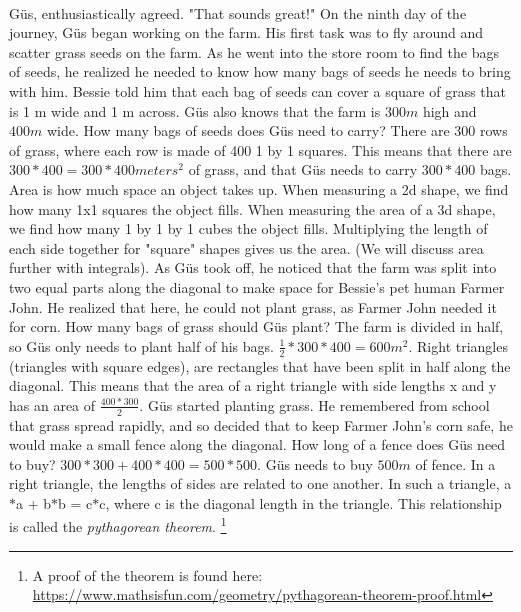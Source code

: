  \paragraph{} Güs, enthusiastically agreed. "That sounds great!"
{On the ninth day of the journey, Güs began working on the farm. His first task was to fly around and scatter grass seeds on the farm. As he went into the store room to find the bags of seeds, he realized he needed to know how many bags of seeds he needs to bring with him. Bessie told him that each bag of seeds can cover a square of grass that is 1 m wide and 1 m across. Güs also knows that the farm is $300 m$ high and $400 m$ wide. How many bags of seeds does Güs need to carry?}
{There are 300 rows of grass, where each row is made of 400 1 by 1 squares. This means that there are $300\ast 400 = 300\ast 400 meters^{2}$ of grass, and that Güs needs to carry $300\ast 400$ bags.}
{Area is how much space an object takes up. When measuring a 2d shape, we find how many 1x1 squares the object fills. When measuring the area of a 3d shape, we find how many 1 by 1 by 1 cubes the object fills. Multiplying the length of each side together for "square" shapes gives us the area. (We will discuss area further with integrals).}
{}
{As Güs took off, he noticed that the farm was split into two equal parts along the diagonal to make space for Bessie's pet human Farmer John. He realized that here, he could not plant grass, as Farmer John needed it for corn. How many bags of grass should Güs plant?}
{The farm is divided in half, so Güs only needs to plant half of his bags. $\frac{1}{2}\ast 300\ast 400 =600 m^{2}$.}
{Right triangles (triangles with square edges), are rectangles that have been split in half along the diagonal. This means that the area of a right triangle with side lengths x and y has an area of $\frac{400*300}{2}$.}
{}
{Güs started planting grass. He remembered from school that grass spread rapidly, and so decided that to keep Farmer John's corn safe, he would make a small fence along the diagonal. How long of a fence does Güs need to buy?}
{$300\ast 300 + 400\ast 400 = 500\ast 500$. Güs needs to buy $500 m$ of fence.}
{In a right triangle, the lengths of sides are related to one another. In such a triangle, a$\ast$a + b$\ast$b = c$\ast$c, where c is the diagonal length in the triangle. This relationship is called the \textit{pythagorean theorem}. \footnote{A proof of the theorem is found here: \url{https://www.mathsisfun.com/geometry/pythagorean-theorem-proof.html}}}
